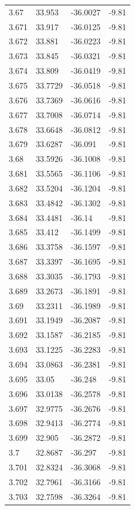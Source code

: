 \begin{tabular}{llll}
3.67 & 33.953 & -36.0027 & -9.81 \\
3.671 & 33.917 & -36.0125 & -9.81 \\
3.672 & 33.881 & -36.0223 & -9.81 \\
3.673 & 33.845 & -36.0321 & -9.81 \\
3.674 & 33.809 & -36.0419 & -9.81 \\
3.675 & 33.7729 & -36.0518 & -9.81 \\
3.676 & 33.7369 & -36.0616 & -9.81 \\
3.677 & 33.7008 & -36.0714 & -9.81 \\
3.678 & 33.6648 & -36.0812 & -9.81 \\
3.679 & 33.6287 & -36.091 & -9.81 \\
3.68 & 33.5926 & -36.1008 & -9.81 \\
3.681 & 33.5565 & -36.1106 & -9.81 \\
3.682 & 33.5204 & -36.1204 & -9.81 \\
3.683 & 33.4842 & -36.1302 & -9.81 \\
3.684 & 33.4481 & -36.14 & -9.81 \\
3.685 & 33.412 & -36.1499 & -9.81 \\
3.686 & 33.3758 & -36.1597 & -9.81 \\
3.687 & 33.3397 & -36.1695 & -9.81 \\
3.688 & 33.3035 & -36.1793 & -9.81 \\
3.689 & 33.2673 & -36.1891 & -9.81 \\
3.69 & 33.2311 & -36.1989 & -9.81 \\
3.691 & 33.1949 & -36.2087 & -9.81 \\
3.692 & 33.1587 & -36.2185 & -9.81 \\
3.693 & 33.1225 & -36.2283 & -9.81 \\
3.694 & 33.0863 & -36.2381 & -9.81 \\
3.695 & 33.05 & -36.248 & -9.81 \\
3.696 & 33.0138 & -36.2578 & -9.81 \\
3.697 & 32.9775 & -36.2676 & -9.81 \\
3.698 & 32.9413 & -36.2774 & -9.81 \\
3.699 & 32.905 & -36.2872 & -9.81 \\
3.7 & 32.8687 & -36.297 & -9.81 \\
3.701 & 32.8324 & -36.3068 & -9.81 \\
3.702 & 32.7961 & -36.3166 & -9.81 \\
3.703 & 32.7598 & -36.3264 & -9.81 \\

\end{tabular}
